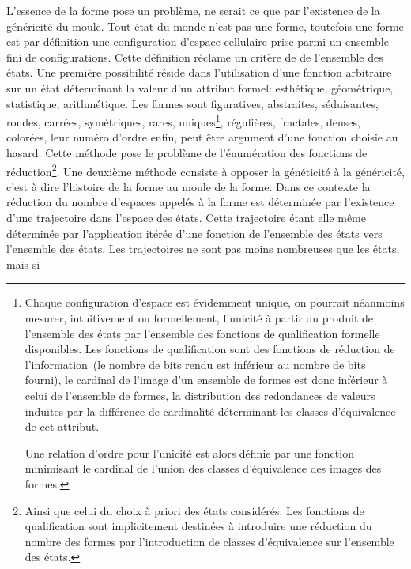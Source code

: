 L'essence de la forme pose un probl\`eme, ne serait ce que
par l'existence de la g\'en\'ericit\'e du moule. %
Tout \'etat du monde n'est pas une forme, toutefois une forme est par
d\'efinition une configuration d'espace cellulaire prise parmi un
ensemble fini de configurations. %
Cette d\'efinition r\'eclame un crit\`ere de
 de l'ensemble des \'etats. %
Une premi\`ere possibilit\'e r\'eside dans l'utilisation d'une fonction
arbitraire sur un \'etat d\'eterminant la valeur d'un attribut formel:
esth\'etique, g\'eom\'etrique, sta\-tistique, arithm\'etique. %
Les formes sont figuratives, abstraites, s\'eduisantes, rondes, carr\'ees,
sym\'etriques, rares, uniques\footnote{%
  Chaque configuration d'espace est \'evidemment unique, on pourrait
  n\'eanmoins mesurer, intuitivement ou formellement, l'unicit\'e \`a partir
  du produit de l'ensemble des \'etats par l'ensemble des
  fonctions de qualification formelle disponibles. %
  Les fonctions de qualification sont des fonctions de r\'eduction de
  l'information~(le nombre de bits rendu est inf\'erieur au nombre de
  bits fourni), le cardinal de l'image d'un ensemble de formes est
  donc inf\'erieur \`a celui de l'ensemble de formes, la distribution des
  redondances de valeurs induites par la diff\'erence de cardinalit\'e
  d\'eterminant les classes d'\'equivalence de cet attribut. %
  
  Une relation d'ordre pour l'unicit\'e est alors d\'efinie par une
  fonction minimisant le cardinal de l'union des classes d'\'equivalence
  des images des formes.}, %
r\'eguli\`eres, fractales, denses, color\'ees, leur num\'ero d'ordre enfin,
peut \^etre argument d'une fonction choisie au hasard. %
Cette m\'ethode pose le probl\`eme de l'\'enum\'eration des fonctions de
r\'eduction\footnote{%
  Ainsi que celui du choix \`a priori des \'etats consid\'er\'es. %
  Les fonctions de qualification sont implicitement destin\'ees \`a
  introduire une r\'eduction du nombre des formes par l'introduction de
  classes d'\'equivalence sur l'ensemble des \'etats.}. %
Une deuxi\`eme m\'ethode consiste \`a opposer la g\'en\'eticit\'e \`a la
g\'en\'ericit\'e, c'est \`a dire l'histoire de la forme au moule de la forme. %
Dans ce contexte la r\'eduction du nombre d'espaces appel\'es \`a la forme
est d\'etermin\'ee par l'existence d'une trajectoire dans l'espace des
\'etats. %
Cette trajectoire \'etant elle m\^eme d\'etermin\'ee par l'application it\'er\'ee
d'une fonction de l'ensemble des \'etats vers l'ensemble des \'etats. %
Les trajectoires ne sont pas moins nombreuses que les \'etats, mais si
